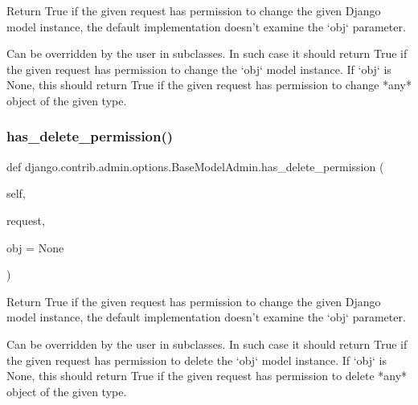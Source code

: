 \begin{DoxyVerb}Return True if the given request has permission to change the given
Django model instance, the default implementation doesn't examine the
`obj` parameter.

Can be overridden by the user in subclasses. In such case it should
return True if the given request has permission to change the `obj`
model instance. If `obj` is None, this should return True if the given
request has permission to change *any* object of the given type.
\end{DoxyVerb}
 \mbox{\label{classdjango_1_1contrib_1_1admin_1_1options_1_1_base_model_admin_a533b21c21a8fb1baf9d92ce22c46ff04}} 
\subsubsection{\texorpdfstring{has\+\_\+delete\+\_\+permission()}{has\_delete\_permission()}}
{\footnotesize\ttfamily def django.\+contrib.\+admin.\+options.\+Base\+Model\+Admin.\+has\+\_\+delete\+\_\+permission (\begin{DoxyParamCaption}\item[{}]{self,  }\item[{}]{request,  }\item[{}]{obj = {\ttfamily None} }\end{DoxyParamCaption})}

\begin{DoxyVerb}Return True if the given request has permission to change the given
Django model instance, the default implementation doesn't examine the
`obj` parameter.

Can be overridden by the user in subclasses. In such case it should
return True if the given request has permission to delete the `obj`
model instance. If `obj` is None, this should return True if the given
request has permission to delete *any* object of the given type.
\end{DoxyVerb}
 \mbox{\label{classdjango_1_1contrib_1_1admin_1_1options_1_1_base_model_admin_a863d817753ebb25163d6704b56b05d5a}} 
